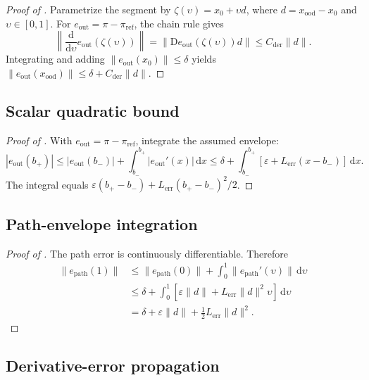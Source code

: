 \begin{proof}[Proof of ]
Parametrize the segment by \(\zeta(\upsilon)=x_0+\upsilon d\), where
\(d=x_{\mathrm{ood}}-x_0\) and \(\upsilon\in[0,1]\). For
\(e_{\mathrm{out}}=\pi-\pi_{\mathrm{ref}}\), the chain rule gives
\[
\left\|\frac{\mathrm d}{\mathrm d\upsilon}e_{\mathrm{out}}(\zeta(\upsilon))\right\|
=\|\mathrm{D}e_{\mathrm{out}}(\zeta(\upsilon))d\|
\leq C_{\mathrm{der}}\|d\|.
\]
Integrating and adding \(\|e_{\mathrm{out}}(x_0)\|\leq\delta\) yields
\(\|e_{\mathrm{out}}(x_{\mathrm{ood}})\|\leq\delta+C_{\mathrm{der}}\|d\|\).
\end{proof}

\subsection{Scalar quadratic bound}
\label{app:proof_scalar}

\begin{proof}[Proof of ]
With \(e_{\mathrm{out}}=\pi-\pi_{\mathrm{ref}}\), integrate the assumed envelope:
\[
|e_{\mathrm{out}}(b_+)|\leq|e_{\mathrm{out}}(b_-)|+\int_{b_-}^{b_+}|e_{\mathrm{out}}'(x)|\,\mathrm d x
\leq\delta+\int_{b_-}^{b_+}
[\varepsilon+L_{\mathrm{err}}(x-b_-)]\,\mathrm d x.
\]
The integral equals
\(\varepsilon(b_+-b_-)+L_{\mathrm{err}}(b_+-b_-)^2/2\).
\end{proof}

\subsection{Path-envelope integration}
\label{app:proof_path}

\begin{proof}[Proof of ]
The path error is continuously differentiable. Therefore
\[
\begin{split}
\|e_{\mathrm{path}}(1)\|
&\leq\|e_{\mathrm{path}}(0)\|
+\int_0^1\|e_{\mathrm{path}}'(\upsilon)\|\,\mathrm d\upsilon\\
&\leq\delta+\int_0^1
[\varepsilon\|d\|+L_{\mathrm{err}}\|d\|^2\upsilon]\,\mathrm d\upsilon\\
&=\delta+\varepsilon\|d\|+\tfrac12 L_{\mathrm{err}}\|d\|^2.
\end{split}
\]
\end{proof}

\subsection{Derivative-error propagation}
\label{app:component_lemma}

